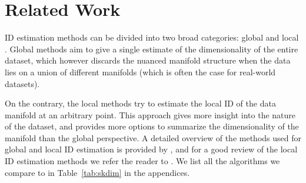 \section{Related Work}



ID estimation methods can be divided into two broad categories: global and local \citep{camastra2016intrinsic}. Global methods aim to give a single estimate of the dimensionality of the entire dataset, which however discards the nuanced manifold structure when the data lies on a union of different manifolds (which is often the case for real-world datasets). 

On the contrary, the local methods \citep{carter2009local,kleindessner2015dimensionality,levina2004maximum,hino2017local,camastra2016intrinsic, rozza2012novel,CERUTI20142569,camastra2002} try to estimate the local ID of the data manifold at an arbitrary point.
This approach gives more insight into the nature of the dataset, and provides more options to summarize the dimensionality of the manifold than the global perspective.
A detailed overview of the methods used for global and local ID estimation is provided by \citet{camastra2016intrinsic}, and for a good review of the local ID estimation methods we refer the reader to \citet{johnsson2014low}. 
We list all the algorithms we compare to in Table~\ref{tab:skdim} in the appendices.







